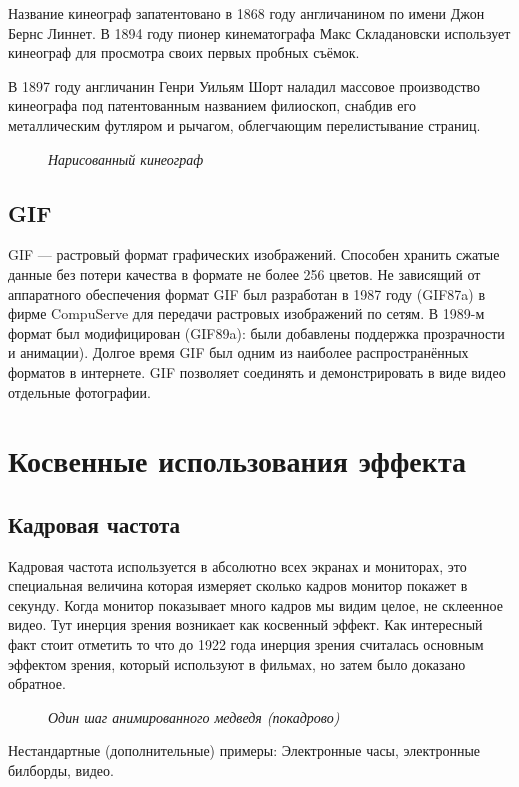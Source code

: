 \documentclass[a4paper, 12pt]{article}
\renewcommand{\sectionmark}[1]{\markright{#1}}
\newcommand{\image}[3]{
	\begin{figure}[ht]
		\center{\texttt{[image: img/\#1]} }
		\caption{\textit{#3}}\end{figure}
}
\begin{document}
Название кинеограф запатентовано в 1868 году англичанином по имени Джон
Бернс Линнет. В 1894 году пионер кинематографа Макс Складановски
использует кинеограф для просмотра своих первых пробных съёмок.


В 1897 году англичанин Генри Уильям Шорт наладил массовое производство
кинеографа под патентованным названием филиоскоп, снабдив его
металлическим футляром и рычагом, облегчающим перелистывание страниц.

\image{Кинеограф.jpg}{300}{Нарисованный кинеограф}

\subsection{GIF}

GIF — растровый формат графических изображений. Способен хранить
сжатые данные без потери качества в формате не более 256 цветов. Не
зависящий от аппаратного обеспечения формат GIF был разработан в 1987
году (GIF87a) в фирме CompuServe для передачи растровых изображений по
сетям. В 1989-м формат был модифицирован (GIF89a): были добавлены
поддержка прозрачности и анимации). Долгое время GIF был одним из
наиболее распространённых форматов в интернете. GIF позволяет соединять
и демонстрировать в виде видео отдельные фотографии.
\newpage
\section{Косвенные использования эффекта}
\pagestyle{fancy}
\renewcommand{\sectionmark}[1]{\markright{#1}}
\fancyhf{}
\fancyhead[R]{\bfseries\thepage}
\fancyhead[LO]{\bfseries\rightmark}

\subsection{Кадровая частота}

Кадровая частота используется в абсолютно всех экранах и мониторах,
это специальная величина которая измеряет сколько кадров монитор покажет
в секунду. Когда монитор показывает много кадров мы видим целое, не
склеенное видео. Тут инерция зрения возникает как косвенный эффект. Как
интересный факт стоит отметить то что до 1922 года инерция зрения
считалась основным эффектом зрения, который используют в фильмах, но
затем было доказано обратное.

\image{Медведь.jpg}{100}{Один шаг анимированного медведя (покадрово)}

Нестандартные (дополнительные) примеры: Электронные часы, электронные
билборды, видео.
\end{document}
